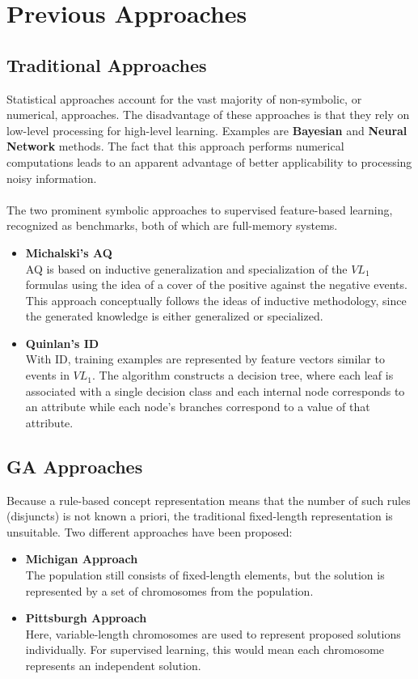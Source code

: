 \documentclass[../main.tex]{subfiles}
\begin{document}
\section{Previous Approaches}

\subsection{Traditional Approaches}
Statistical approaches account for the vast majority of non-symbolic, or numerical, approaches. The disadvantage of
these approaches is that they rely on low-level processing for high-level learning. Examples are \textbf{Bayesian} and
\textbf{Neural Network} methods. The fact that this approach performs numerical computations leads to an
apparent advantage of better applicability to processing noisy information.
\\\\
The two prominent symbolic approaches to supervised feature-based learning, recognized
as benchmarks, both of which are full-memory systems.

\begin{itemize}
	\item \textbf{Michalski's AQ} \\
	AQ is based on inductive generalization and specialization of the $VL_1$ formulas using the idea of a cover of the
	positive against the negative events. This approach conceptually follows the ideas of inductive methodology, since
	the generated knowledge is either generalized or specialized.
	\item \textbf{Quinlan's  ID} \\
	With ID, training examples are represented by feature vectors similar to events in $VL_1$.  The algorithm
	constructs a decision tree, where each leaf is associated with a single decision class and each internal node
	corresponds to an attribute while each node's branches correspond to a value of that attribute.
\end{itemize}

\subsection{GA Approaches}
Because a rule-based concept representation means that the number of such rules (disjuncts) is not known a priori,  the
traditional fixed-length representation is unsuitable. Two different approaches have been proposed:

\begin{itemize}
	\item \textbf{Michigan Approach} \\
	The population still consists of fixed-length elements, but the solution is represented by a set of chromosomes
	from the population.
	\item \textbf{Pittsburgh Approach} \\
	Here, variable-length chromosomes are used to represent proposed solutions individually. For supervised learning,
	this would mean each chromosome represents an independent solution.
\end{itemize}
\end{document}
